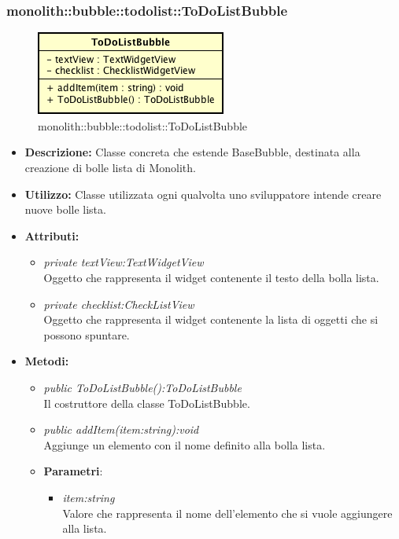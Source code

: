 \subsubsection{monolith::bubble::todolist::ToDoListBubble}

\label{monolith::bubble::todolist::ToDoListBubble}
\begin{figure}[ht]
	\centering
	\includegraphics[scale=0.5]{Sezioni/SottosezioniST/img/ToDoListBubble.png}
	\caption{monolith::bubble::todolist::ToDoListBubble}
\end{figure}

\begin{itemize}
\item \textbf{Descrizione:} Classe concreta che estende BaseBubble, destinata alla creazione di bolle lista di Monolith.
\item \textbf{Utilizzo:} Classe utilizzata ogni qualvolta uno sviluppatore intende creare nuove bolle lista.
\item \textbf{Attributi:}
\begin{itemize}
\item \textit{private textView:TextWidgetView}\\
Oggetto che rappresenta il widget contenente il testo della bolla lista.
\item \textit{private checklist:CheckListView}\\
Oggetto che rappresenta il widget contenente la lista di oggetti che si possono spuntare.
\end{itemize}
\item \textbf{Metodi:}
\begin{itemize}
\item \textit{public ToDoListBubble():ToDoListBubble}\\
Il costruttore della classe ToDoListBubble.
\item \textit{public addItem(item:string):void}\\
Aggiunge un elemento con il nome definito alla bolla lista.
\item{\textbf{Parametri}: \begin{itemize}
\item \textit{item:string}\\
Valore che rappresenta il nome dell'elemento che si vuole aggiungere alla lista.
\end{itemize}}
\end{itemize}
\end{itemize}

